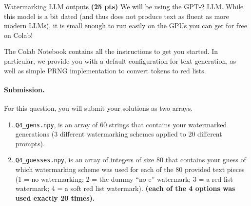 \begin{question}{
Watermarking LLM outputs \textbf{(25 pts)}}
We will be using the GPT-2 LLM. While this model is a bit dated (and thus does not produce text as fluent as more modern LLMs), it is small enough to run easily on the GPUs you can get for free on Colab!

The Colab Notebook contains all the instructions to get you started.
In particular, we provide you with a default configuration for text generation, as well as simple PRNG implementation to convert tokens to red lists.

\paragraph{Submission.}
For this question, you will submit your solutions as two \numpy arrays.

\begin{enumerate}
    \item \texttt{Q4\_gens.npy}, is an array of $60$ strings that contains your watermarked generations (3 different watermarking schemes applied to 20 different prompts).
    \item \texttt{Q4\_guesses.npy}, is an array of integers of size $80$ that contains your guess of which watermarking scheme was used for each of the 80 provided text pieces (1 = no watermarking; 2 = the dummy ``no e'' watermark; 3 = a red list watermark; 4 = a soft red list watermark). \textbf{(each of the 4 options was used exactly 20 times).}
\end{enumerate}

\end{question}